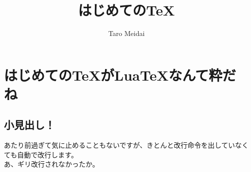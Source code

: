 \documentclass{ltjsarticle}
\begin{document}
\title{はじめての\TeX }
\author{Taro Meidai}
\maketitle
\section{はじめての\TeX がLua\TeX なんて粋だね}

\subsection{小見出し！}
あたり前過ぎて気に止めることもないですが、きとんと改行命令を出していなくても自動で改行します。
\\あ、ギリ改行されなかったか。
\end{document}
